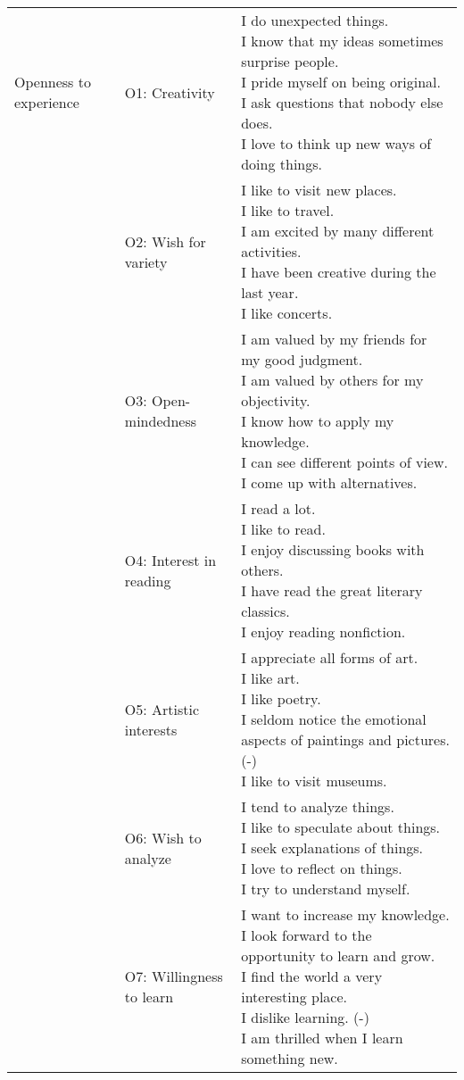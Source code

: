 \documentclass[,man,floatsintext]{apa6}
\theoremstyle{definition}
\theoremstyle{definition}
\theoremstyle{definition}
\theoremstyle{remark}
\begin{document}
\begin{longtable}[t]{lll}
\addlinespace
Openness to experience & O1: Creativity & \makecell[l]{I do unexpected things.\\I know that my ideas sometimes surprise people.\\I pride myself on being original.\\I ask questions that nobody else does.\\I love to think up new ways of doing things.}\\
\addlinespace
 & O2: Wish for variety & \makecell[l]{I like to visit new places.\\I like to travel.\\I am excited by many different activities.\\I have been creative during the last year.\\I like concerts.}\\
\addlinespace
 & O3: Open-mindedness & \makecell[l]{I am valued by my friends for my good judgment.\\I am valued by others for my objectivity.\\I know how to apply my knowledge.\\I can see different points of view.\\I come up with alternatives.}\\
\addlinespace
 & O4: Interest in reading & \makecell[l]{I read a lot.\\I like to read.\\I enjoy discussing books with others.\\I have read the great literary classics.\\I enjoy reading nonfiction.}\\
\addlinespace
 & O5: Artistic interests & \makecell[l]{I appreciate all forms of art.\\I like art.\\I like poetry.\\I seldom notice the emotional aspects of paintings and pictures. (-)\\I like to visit museums.}\\
\addlinespace
 & O6: Wish to analyze & \makecell[l]{I tend to analyze things.\\I like to speculate about things.\\I seek explanations of things.\\I love to reflect on things.\\I try to understand myself.}\\
\addlinespace
 & O7: Willingness to learn & \makecell[l]{I want to increase my knowledge.\\I look forward to the opportunity to learn and grow.\\I find the world a very interesting place.\\I dislike learning. (-)\\I am thrilled when I learn something new.}\\

\end{longtable}
\end{document}
